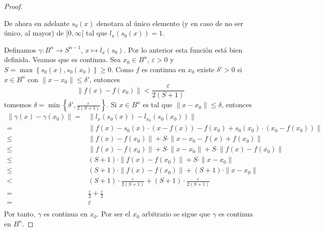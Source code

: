 \documentclass[12pt]{report}
\theoremstyle{largebreak}
\newcommand\cf[3]{\ensuremath{#1:#2\rightarrow#3}}
\begin{document}
\begin{proof}
\begin{obs}
        De ahora en adelante $s_0(x)$ denotara al único elemento (y en caso de no ser único, al mayor) de $[0,\infty[$ tal que $l_x(s_0(x))=1$.
    \end{obs}

    Definamos $\cf{\gamma}{B^n}{S^{n-1}}$, $x\mapsto l_x(s_0)$. Por lo anterior esta función está bien definida. Veamos que es continua. Sea $x_0\in B^n$, $\varepsilon>0$ y $S=\max\left\{s_0(x),s_0(x_0)\right\}\geq0$. Como $f$ es continua en $x_0$ existe $\delta'>0$ si $x\in B^n$ con $\|x-x_0\|\leq\delta'$, entonces
    \begin{equation*}
        \|f(x)-f(x_0)\|<\frac{\varepsilon}{2(S+1)}
    \end{equation*}
    tomemos $\delta = \min\left\{\delta',\frac{\varepsilon}{2(S+1)}\right\}$. Si $x\in B^n$ es tal que $\|x-x_0\|\leq\delta$, entonces
    \begin{equation*}
        \begin{split}
            \|\gamma(x)-\gamma(x_0)\|=&\|l_x(s_0(x))-l_{x_0}(s_0(x_0))\|\\
            =&\|f(x)-s_0(x)\cdot\left(x-f(x)\right)-f(x_0)+s_0(x_0)\cdot\left(x_0-f(x_0)\right)\|\\
            \leq&\|f(x)-f(x_0)\|+S\cdot\|x-x_0-f(x)+f(x_0)\|\\
            \leq&\|f(x)-f(x_0)\|+S\cdot\|x-x_0\|+S\cdot\|f(x)-f(x_0)\|\\
            \leq&(S+1)\cdot\|f(x)-f(x_0)\|+S\cdot\|x-x_0\|\\
            \leq&(S+1)\cdot\|f(x)-f(x_0)\|+(S+1)\cdot\|x-x_0\|\\
            <&(S+1)\cdot\frac{\varepsilon}{2(S+1)}+(S+1)\cdot\frac{\varepsilon}{2(S+1)}\\
            =&\frac{\varepsilon}{2}+\frac{\varepsilon}{2}\\
            =&\varepsilon\\
        \end{split}
    \end{equation*}
    Por tanto, $\gamma$ es continua en $x_0$. Por ser el $x_0$ arbitrario se sigue que $\gamma$ es continua en $B^n$.


\end{proof}
\end{document}
